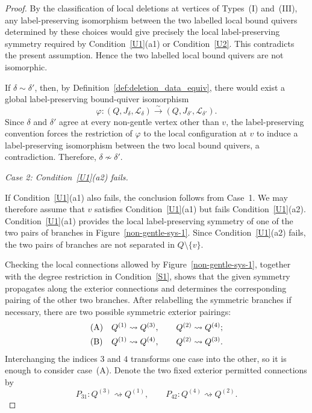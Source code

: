 \documentclass[11pt]{amsart}
\numberwithin{equation}{section}
\theoremstyle{definition}
\begin{document}
\begin{proof}
By the classification of local deletions at vertices of
Types~\textup{(I)} and~\textup{(III)}, any label-preserving
isomorphism between the two labelled local bound quivers determined
by these choices would give precisely the local label-preserving
symmetry required by Condition~\ref{U1}\textup{(a1)} or
Condition~\ref{U2}. This contradicts the present assumption. Hence
the two labelled local bound quivers are not isomorphic.

If \(\delta\sim\delta'\), then, by
Definition~\ref{def:deletion_data_equiv}, there would exist a global
label-preserving bound-quiver isomorphism
\[
  \varphi\colon
  (Q,J_{\delta},\mathcal L_{\delta})
  \xrightarrow{\sim}
  (Q,J_{\delta'},\mathcal L_{\delta'}).
\]
Since \(\delta\) and \(\delta'\) agree at every non-gentle vertex
other than \(v\), the label-preserving convention forces the
restriction of \(\varphi\) to the local configuration at \(v\) to
induce a label-preserving isomorphism between the two local bound
quivers, a contradiction. Therefore, $\delta\not\sim\delta'$.


\smallskip
\noindent
\emph{Case 2: Condition~\ref{U1}\textup{(a2)} fails.}

If Condition~\ref{U1}\textup{(a1)} also fails, the conclusion follows
from Case~1. We may therefore assume that \(v\) satisfies
Condition~\ref{U1}\textup{(a1)} but fails
Condition~\ref{U1}\textup{(a2)}. Condition~\ref{U1}\textup{(a1)}
provides the local label-preserving symmetry of one of the two pairs
of branches in Figure~\ref{non-gentle-sys-1}. Since
Condition~\ref{U1}\textup{(a2)} fails, the two pairs of branches are
not separated in \(Q\setminus\{v\}\).

Checking the local connections allowed by
Figure~\ref{non-gentle-sys-1}, together with the degree restriction
in Condition~\ref{S1}, shows that the given symmetry propagates along
the exterior connections and determines the corresponding pairing of
the other two branches. After relabelling the symmetric branches if
necessary, there are two possible symmetric exterior pairings:
\[
\begin{array}{ll}
\textup{(A)} &
Q^{(1)}\rightsquigarrow Q^{(3)},\qquad
Q^{(2)}\rightsquigarrow Q^{(4)};\\[1.5mm]
\textup{(B)} &
Q^{(1)}\rightsquigarrow Q^{(4)},\qquad
Q^{(2)}\rightsquigarrow Q^{(3)}.
\end{array}
\]
Interchanging the indices \(3\) and \(4\) transforms one case into
the other, so it is enough to consider case~\textup{(A)}. Denote the
two fixed exterior permitted connections by
\[
  P_{31}\colon Q^{(3)}\rightsquigarrow Q^{(1)},
  \qquad
  P_{42}\colon Q^{(4)}\rightsquigarrow Q^{(2)}.
\]


\end{proof}
\end{document}

